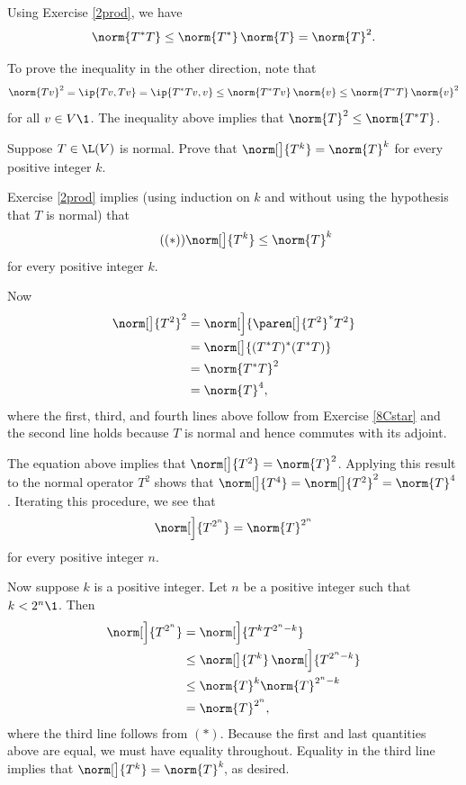 \begin{Solution}
Using Exercise \ref{2prod}, we have
\[
\norm{T^*T} \le \norm{T^*} \, \norm{T} = \norm{T}^2.
\]

To prove the inequality in the other direction, note that
\[
\norm{Tv}^2 = \ip{Tv, Tv} = \ip{T^*Tv, v} \le \norm{T^*Tv} \, \norm{v} \le \norm{T^*T} \, \norm{v}^2
\]
for all $v \in V\1$. The inequality above implies that $\norm{T}^2 \le \norm{T^*T}$.
\end{Solution}

\exercise
Suppose $T \in \L(V)$ is normal. Prove that $\norm[\big]{T^k} = \norm{T}^k$ for every positive integer $k$.\label{7normTk}

\begin{Solution}
Exercise \ref{2prod} implies (using induction on $k$ and without using the hypothesis that $T$ is normal) that
\[ \tag{$(*)$}
\norm[\big]{T^k} \le \norm{T}^k
\]
for every positive integer $k$.

Now
\begin{align*}
\norm[\big]{T^2}^2 &= \norm[\Big]{ \paren[\big]{T^2}^* T^2 } \\
&= \norm[\big]{ (T^* T)^* (T^*T)}\\
&= \norm{T^*T}^2 \\
&= \norm{T}^4,
\end{align*}
where the first, third, and fourth lines above follow from Exercise \ref{8Cstar} and the second line holds because $T$ is normal and hence commutes with its adjoint.

The equation above implies that $\norm[\big]{T^2} = \norm{T}^2$. Applying this result to the normal operator $T^2$ shows that
$\norm[\big]{T^4} = \norm[\big]{T^2}^2 = \norm{T}^4$. Iterating this procedure, we see that
\[
\norm[\Big]{ T^{2^n} } = \norm{T}^{2^n}
\]
for every positive integer $n$.

Now suppose $k$ is a positive integer. Let $n$ be a positive integer such that $k < 2^n\1$. Then
\begin{align*}
\norm[\Big]{T^{2^n} } &= \norm[\Big]{ T^k T^{2^n - k} }\\
&\le \norm[\big]{T^k} \,\norm[\Big]{T^{2^n - k}} \\
&\le \norm{T}^k \norm{T}^{2^n - k} \\
&= \norm{T}^{2^n},
\end{align*}
where the third line follows from $(*)$. Because the first and last quantities above are equal, we must have equality throughout. Equality in the third line implies that $\norm[\big]{T^k} = \norm{T}^k\!$, as desired.
\end{Solution}

